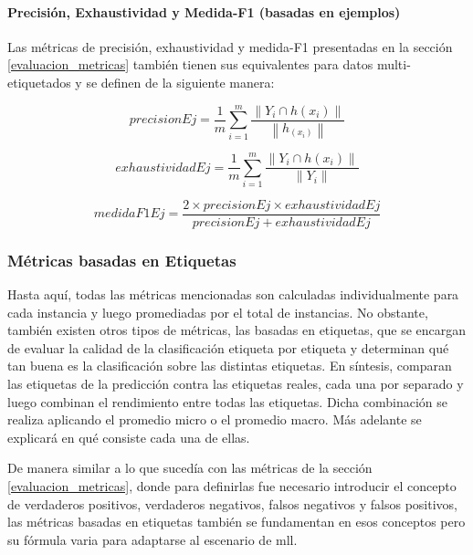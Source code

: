 \paragraph{Precisión, Exhaustividad y Medida-F1 (basadas en ejemplos)} 

Las métricas de precisión, exhaustividad y medida-F1 presentadas en la sección
\ref{evaluacion_metricas} también tienen sus equivalentes para datos
multi-etiquetados y se definen de la siguiente manera:

\begin{equation}
   precisionEj = \frac{1}{m} \sum_{i=1}^{m} 
   \frac{\left\|Y_{i} \cap h(x_{i})\right\|}
   {\left\|h_(x_{i})\right\|} 
\end{equation}

\begin{equation}
   exhaustividadEj = \frac{1}{m} \sum_{i=1}^{m} 
   \frac{\left\|Y_{i} \cap h(x_{i})\right\|}
   {\left\|Y_{i}\right\|} 
\end{equation}

\begin{equation}
   medidaF1Ej = \frac{2 \times precisionEj \times exhaustividadEj}{ precisionEj +
   exhaustividadEj }
\end{equation}


\subsubsection{Métricas basadas en Etiquetas}

Hasta aquí, todas las métricas mencionadas son calculadas individualmente para
cada instancia y luego promediadas por el total de instancias. No obstante,
también existen otros tipos de métricas, las basadas en etiquetas, que se
encargan de evaluar la calidad de la clasificación etiqueta por etiqueta y
determinan qué tan buena es la clasificación sobre las distintas etiquetas.  En
síntesis, comparan las etiquetas de la predicción contra las etiquetas reales,
cada una por separado y luego combinan el rendimiento entre todas las etiquetas.
Dicha combinación se realiza aplicando el promedio micro o el promedio macro.
Más adelante se explicará en qué consiste cada una de ellas.

De manera similar a lo que sucedía con las métricas de la sección
\ref{evaluacion_metricas}, donde para definirlas fue necesario introducir el
concepto de verdaderos positivos, verdaderos negativos, falsos negativos y
falsos positivos, las métricas basadas en etiquetas también se fundamentan en
esos conceptos pero su fórmula varia para adaptarse al escenario de
\acrshort{mll}.

